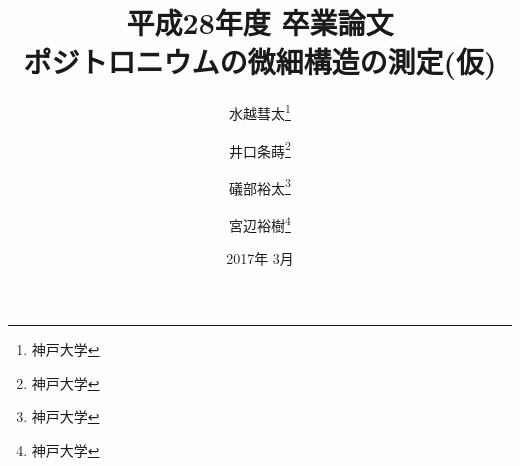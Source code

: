 \documentclass[uplatex,report]{jsbook}
\begin{document}
\title{平成28年度 卒業論文\\
ポジトロニウムの微細構造の測定(仮)}
\author{水越彗太\thanks{神戸大学}\and 井口条蒔\thanks{神戸大学}\and 礒部裕太\thanks{神戸大学}\and 宮辺裕樹\thanks{神戸大学}}
\date{2017年 3月}

\maketitle



\tableofcontents
\listoffigures
\listoftables









\appendix


\end{document}
